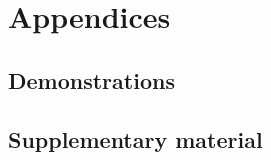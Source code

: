 \documentclass[12pt, titlepage, twoside, openright]{report}
\begin{document}

%  
  \chapter{Appendices}
  \section{Demonstrations}
  
  \section{Supplementary material}
  
  \printbibliography
\end{document}
